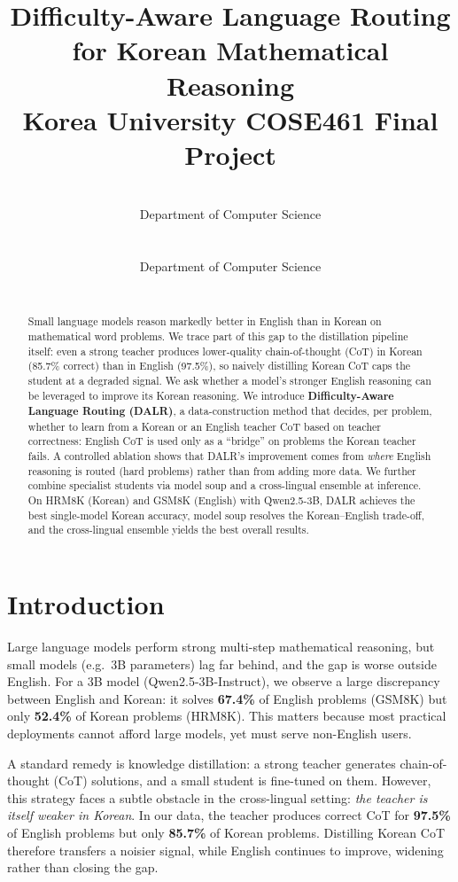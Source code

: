 \documentclass{article}
\title{
  Difficulty-Aware Language Routing for Korean Mathematical Reasoning \\
  \vspace{1em}
  \small{\normalfont Korea University COSE461 Final Project}
}
\author{
  \note{Your Name} \\
   Department of Computer Science \\
   \note{Team N} \\
   \note{2022320317}
   \And
   \note{Teammate Name} \\
   Department of Computer Science \\
   \note{Team N} \\
   \note{20XXXXXXXX}
}
\begin{document}
\maketitle

\begin{abstract}
Small language models reason markedly better in English than in Korean
on mathematical word problems. We trace part of this gap to the
distillation pipeline itself: even a strong teacher produces
lower-quality chain-of-thought (CoT) in Korean (85.7\% correct) than in
English (97.5\%), so naively distilling Korean CoT caps the student at a
degraded signal. We ask whether a model's stronger English reasoning can
be leveraged to improve its Korean reasoning. We introduce
\textbf{Difficulty-Aware Language Routing (DALR)}, a data-construction
method that decides, per problem, whether to learn from a Korean or an
English teacher CoT based on teacher correctness: English CoT is used
only as a ``bridge'' on problems the Korean teacher fails. A controlled
ablation shows that DALR's improvement comes from \emph{where} English
reasoning is routed (hard problems) rather than from adding more data.
We further combine specialist students via model soup
\citep{wortsman2022soup} and a cross-lingual ensemble at inference. On
HRM8K (Korean) and GSM8K (English) with Qwen2.5-3B, DALR achieves the
best single-model Korean accuracy, model soup resolves the
Korean--English trade-off, and the cross-lingual ensemble yields the
best overall results.
\end{abstract}

\section{Introduction}
\label{sec:intro}

Large language models perform strong multi-step mathematical reasoning,
but small models (e.g.\ 3B parameters) lag far behind, and the gap is
worse outside English. For a 3B model (Qwen2.5-3B-Instruct), we observe a
large discrepancy between English and Korean: it solves \textbf{67.4\%}
of English problems (GSM8K) but only \textbf{52.4\%} of Korean problems
(HRM8K). This matters because most practical deployments cannot afford
large models, yet must serve non-English users.

A standard remedy is knowledge distillation: a strong teacher generates
chain-of-thought (CoT) solutions, and a small student is fine-tuned on
them. However, this strategy faces a subtle obstacle in the
cross-lingual setting: \emph{the teacher is itself weaker in Korean}.
In our data, the teacher produces correct CoT for \textbf{97.5\%} of
English problems but only \textbf{85.7\%} of Korean problems. Distilling
Korean CoT therefore transfers a noisier signal, while English continues
to improve, widening rather than closing the gap.
\end{document}

